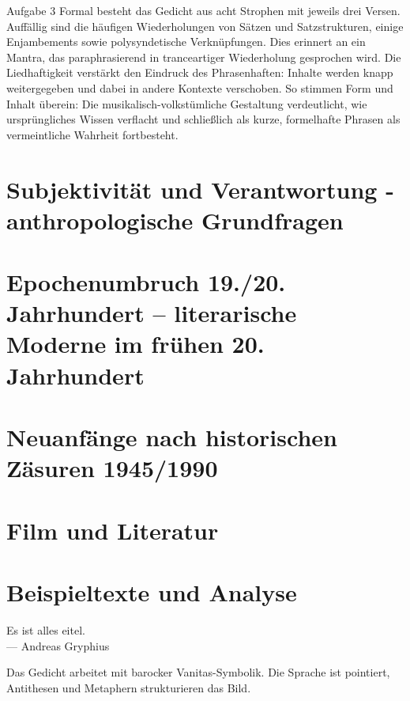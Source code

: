 \documentclass[11pt,a4paper,oneside]{article}
\begin{document}
	\begin{loesung}{Aufgabe 3}
	Formal besteht das Gedicht aus acht Strophen mit jeweils drei Versen. Auffällig sind die häufigen Wiederholungen von Sätzen und Satzstrukturen, einige Enjambements sowie polysyndetische Verknüpfungen. Dies erinnert an ein Mantra, das paraphrasierend in tranceartiger Wiederholung gesprochen wird. Die Liedhaftigkeit verstärkt den Eindruck des Phrasenhaften: Inhalte werden knapp weitergegeben und dabei in andere Kontexte verschoben. So stimmen Form und Inhalt überein: Die musikalisch-volkstümliche Gestaltung verdeutlicht, wie ursprüngliches Wissen verflacht und schließlich als kurze, formelhafte Phrasen als vermeintliche Wahrheit fortbesteht.
	\end{loesung}
	
	
	\newpage
	
	
	
	\section{Subjektivität und Verantwortung - anthropologische Grundfragen}
	\section{Epochenumbruch 19./20. Jahrhundert – literarische Moderne im frühen 20. Jahrhundert}
	\section{Neuanfänge nach historischen Zäsuren 1945/1990}
	\section{Film und Literatur}
	
	\newpage
	
	\section{Beispieltexte und Analyse}
	
	\begin{zitat}
		Es ist alles eitel. \\
		— Andreas Gryphius
	\end{zitat}
	
	\begin{interpret}
		Das Gedicht arbeitet mit barocker Vanitas-Symbolik. Die Sprache ist pointiert, Antithesen und Metaphern strukturieren das Bild.
	\end{interpret}
	
\end{document}
